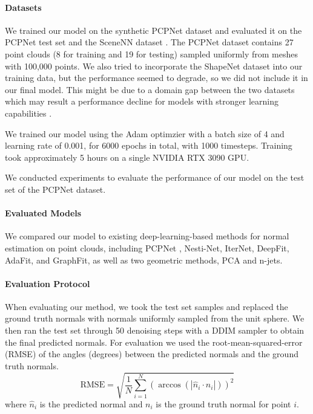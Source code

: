 \documentclass{acmart}
\begin{document}
\paragraph{Datasets}
We trained our model on the synthetic PCPNet dataset \cite{guerrero2018pcpnet} and evaluated it on the PCPNet test set and the SceneNN dataset \cite{scenenn-3dv16}. The PCPNet dataset contains 27 point clouds (8 for training and 19 for testing) sampled uniformly from meshes with 100,000 points. We also tried to incorporate the ShapeNet dataset \cite{chang2015shapenet} into our training data, but the performance seemed to degrade, so we did not include it in our final model. This might be due to a domain gap between the two datasets which may result a performance decline for models with stronger learning capabilities \cite{arXiv:2406.09681}.

We trained our model using the Adam optimzier with a batch size of 4 and learning rate of 0.001, for 6000 epochs in total, with 1000 timesteps. Training took approximately 5 hours on a single NVIDIA RTX 3090 GPU.

We conducted experiments to evaluate the performance of our model on the test set of the PCPNet dataset.

\paragraph{Evaluated Models}
We compared our model to existing deep-learning-based methods for normal estimation on point clouds, including PCPNet \cite{guerrero2018pcpnet}, Nesti-Net, IterNet, DeepFit, AdaFit, and GraphFit, as well as two geometric methods, PCA and n-jets.
\paragraph{Evaluation Protocol}
When evaluating our method, we took the test set samples and replaced the ground truth normals with normals uniformly sampled from the unit sphere. We then ran the test set through 50 denoising steps with a DDIM sampler to obtain the final predicted normals.
For evaluation we used the root-mean-squared-error (RMSE) of the angles (degrees) between the predicted normals and the ground truth normals.
\begin{equation}
    \text{RMSE} = \sqrt{\frac{1}{N}\sum_{i=1}^{N}(\arccos(|\hat{n}_i \cdot n_i|))^2}
\end{equation}
where $\hat{n}_i$ is the predicted normal and $n_i$ is the ground truth normal for point $i$.
\end{document}
